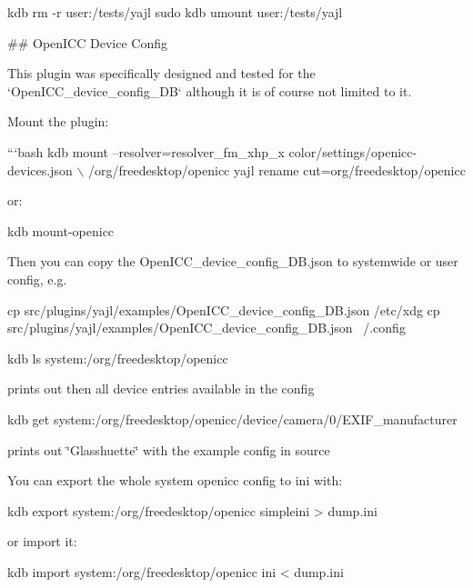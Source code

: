 kdb rm -\/r user\+:/tests/yajl sudo kdb umount user\+:/tests/yajl 
\begin{DoxyCode}
## OpenICC Device Config

This plugin was specifically designed and tested for the
`OpenICC\_device\_config\_DB` although it is of course not limited
to it.

Mount the plugin:

```bash
kdb mount --resolver=resolver\_fm\_xhp\_x color/settings/openicc-devices.json \(\backslash\)
  /org/freedesktop/openicc yajl rename cut=org/freedesktop/openicc
\end{DoxyCode}


or\+:


\begin{DoxyCode}
kdb mount-openicc
\end{DoxyCode}


Then you can copy the {\ttfamily Open\+I\+C\+C\+\_\+device\+\_\+config\+\_\+\+D\+B.\+json} to systemwide or user config, e.\+g.


\begin{DoxyCode}
cp src/plugins/yajl/examples/OpenICC\_device\_config\_DB.json /etc/xdg
cp src/plugins/yajl/examples/OpenICC\_device\_config\_DB.json ~/.config

kdb ls system:/org/freedesktop/openicc
\end{DoxyCode}


prints out then all device entries available in the config


\begin{DoxyCode}
kdb get system:/org/freedesktop/openicc/device/camera/0/EXIF\_manufacturer
\end{DoxyCode}


prints out \char`\"{}\+Glasshuette\char`\"{} with the example config in source

You can export the whole system openicc config to ini with\+:


\begin{DoxyCode}
kdb export system:/org/freedesktop/openicc simpleini > dump.ini
\end{DoxyCode}


or import it\+:


\begin{DoxyCode}
kdb import system:/org/freedesktop/openicc ini < dump.ini
\end{DoxyCode}
 